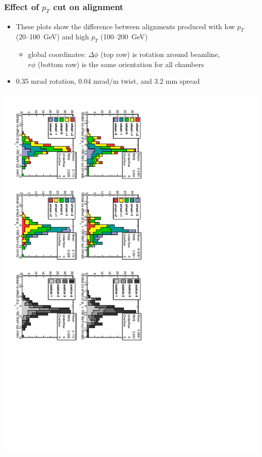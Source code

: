 \documentclass[compress]{beamer}
\begin{document}
\begin{frame}
\frametitle{Effect of $p_T$ cut on alignment}

\begin{itemize}
\item These plots show the difference between alignments produced with low $p_T$ (20--100~GeV) and high $p_T$ (100--200~GeV)
\begin{itemize}
\item global coordinates: $\Delta \phi$ (top row) is rotation around beamline, \\ $r\phi$ (bottom row) is the same orientation for all chambers
\end{itemize}
\item 0.35 mrad rotation, 0.04 mrad/m twist, and 3.2 mm spread
\end{itemize}

\includegraphics[height=\linewidth, angle=90]{data_effect_of_100GeVcut3.pdf}
\end{frame}
\end{document}
